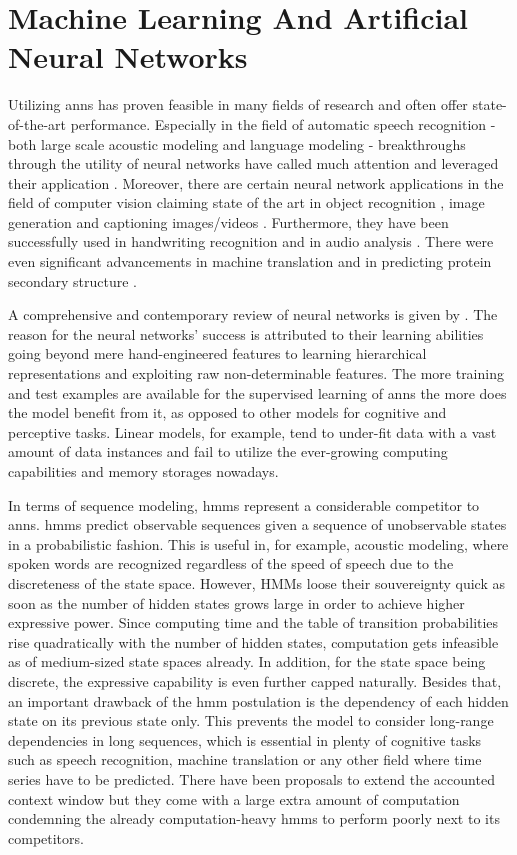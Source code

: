 \section{Machine Learning And Artificial Neural Networks}
\label{sec:ml_ann}
Utilizing \glspl{ann} has proven feasible in many fields of research and often offer state-of-the-art performance.
Especially in the field of automatic speech recognition - both large scale acoustic modeling and language modeling - breakthroughs through the utility of neural networks have called much attention and leveraged their application \cite{GraSchmi2005, SaSe2015, SakHa2014}.
Moreover, there are certain neural network applications in the field of computer vision claiming state of the art in object recognition \cite{LiHu2015}, image generation \cite{GreDa2015} and captioning images/videos \cite{DoHe2014, MaXu2014}.
Furthermore, they have been successfully used in handwriting recognition \cite{DoKo2014, GraLi2009} and in audio analysis \cite{MaFe2014}.
There were even significant advancements in machine translation \cite{LuSu2014} and in predicting protein secondary structure \cite{SoWi2014}. 

A comprehensive and contemporary review of neural networks is given by \cite{Lipton2015}.
The reason for the neural networks' success is attributed to their learning abilities going beyond mere hand-engineered features to learning hierarchical representations and exploiting raw non-determinable features.
The more training and test examples are available for the supervised learning of \glspl{ann} the more does the model benefit from it, as opposed to other models for cognitive and perceptive tasks.
Linear models, for example, tend to under-fit data with a vast amount of data instances and fail to utilize the ever-growing computing capabilities and memory storages nowadays.

In terms of sequence modeling, \glspl{hmm} represent a considerable competitor to \glspl{ann}.
\glspl{hmm} predict observable sequences given a sequence of unobservable states in a probabilistic fashion.
This is useful in, for example, acoustic modeling, where spoken words are recognized regardless of the speed of speech due to the discreteness of the state space.  
However, HMMs loose their souvereignty quick as soon as the number of hidden states grows large in order to achieve higher expressive power.
Since computing time and the table of transition probabilities rise quadratically with the number of hidden states, computation gets infeasible as of medium-sized state spaces already.
In addition, for the state space being discrete, the expressive capability is even further capped naturally.
Besides that, an important drawback of the \gls{hmm} postulation is the dependency of each hidden state on its previous state only.
This prevents the model to consider long-range dependencies in long sequences, which is essential in plenty of cognitive tasks such as speech recognition, machine translation or any other field where time series have to be predicted.
There have been proposals to extend the accounted context window but they come with a large extra amount of computation condemning the already computation-heavy \glspl{hmm} to perform poorly next to its competitors.

